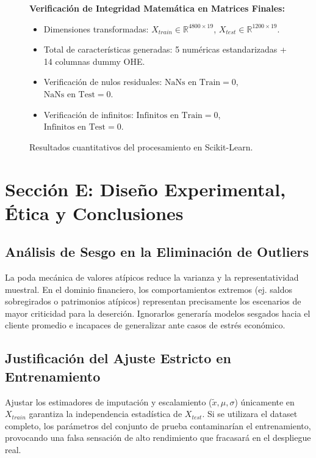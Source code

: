 \documentclass[12pt,a4paper]{article}
\begin{document}
\begin{figure}[H]
\centering
\begin{tcolorbox}[colback=barGray!20,colframe=sectionBlue,width=0.95\linewidth,arc=1mm]
\small
\textbf{Verificación de Integridad Matemática en Matrices Finales:}
\begin{itemize}[noitemsep]
    \item Dimensiones transformadas: $X_{train} \in \mathbb{R}^{4800 \times 19}$, $X_{test} \in \mathbb{R}^{1200 \times 19}$.
    \item Total de características generadas: 5 numéricas estandarizadas + 14 columnas dummy OHE.
    \item Verificación de nulos residuales: $\text{NaNs en Train} = 0$, $\text{NaNs en Test} = 0$.
    \item Verificación de infinitos: $\text{Infinitos en Train} = 0$, $\text{Infinitos en Test} = 0$.
\end{itemize}
\end{tcolorbox}
\caption{Resultados cuantitativos del procesamiento en Scikit-Learn.}
\end{figure}

\section{Sección E: Diseño Experimental, Ética y Conclusiones}

\subsection{Análisis de Sesgo en la Eliminación de Outliers}
La poda mecánica de valores atípicos reduce la varianza y la representatividad muestral. En el dominio financiero, los comportamientos extremos (ej. saldos sobregirados o patrimonios atípicos) representan precisamente los escenarios de mayor criticidad para la deserción. Ignorarlos generaría modelos sesgados hacia el cliente promedio e incapaces de generalizar ante casos de estrés económico.

\subsection{Justificación del Ajuste Estricto en Entrenamiento}
Ajustar los estimadores de imputación y escalamiento ($\tilde{x}, \mu, \sigma$) únicamente en $X_{train}$ garantiza la independencia estadística de $X_{test}$. Si se utilizara el dataset completo, los parámetros del conjunto de prueba contaminarían el entrenamiento, provocando una falsa sensación de alto rendimiento que fracasará en el despliegue real.
\end{document}
